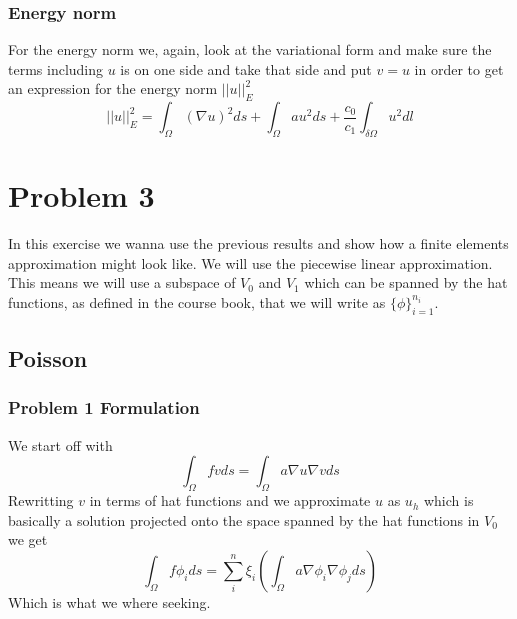 \documentclass[11pt]{article}
\begin{document}
\subsubsection{Energy norm}
For the energy norm we, again, look at the variational form and make sure the terms including $u$ is on one side and take that side and put $v=u$ in order to get an expression for the energy norm $||u||^2_E$
\begin{equation}
	||u||^2_E = \int_{\Omega} (\nabla u)^2 ds + \int_{\Omega} a u^2 ds + \frac{c_0}{c_1}\int_{\delta \Omega} u^2 dl 
\end{equation}

\section{Problem 3}
In this exercise we wanna use the previous results and show how a finite elements approximation might look like. We will use the piecewise linear approximation. This means we will use a subspace of $V_0$ and $V_1$ which can be spanned by the hat functions, as defined in the course book, that we will write as $\{\phi\}^{n_i}_{i=1}$.
\subsection{Poisson}
\subsubsection{Problem 1 Formulation}
We start off with
\begin{equation}
	\int_{\Omega} f v d s = \int_{\Omega} a \nabla u \nabla v ds
\end{equation}
Rewritting $v$ in terms of hat functions and we approximate $u$ as $u_h$ which is basically a solution projected onto the space spanned by the hat functions in $V_0$ we get
\begin{equation}
	\int_{\Omega} f \phi_i ds = \sum^n_i \xi_i (\int_{\Omega} a \nabla \phi_i \nabla \phi_j ds)
\end{equation}
Which is what we where seeking.
\end{document}
